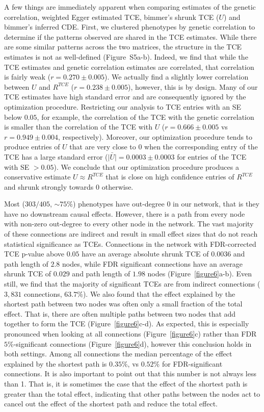 \documentclass{article}
\begin{document}
A few things are immediately apparent when comparing estimates of the
genetic correlation, weighted Egger estimated TCE, bimmer's
shrunk TCE ($U$) and bimmer's inferred CDE. First, we clustered phenotypes by genetic correlation
to determine if the patterns observed are shared in the TCE estimates.
While there are some similar patterns across the two matrices, the structure in the TCE estimates
is not as well-defined (Figure~S5a-b).
Indeed, we find that while the TCE estimates
and genetic correlation estimates are correlated, that correlation is fairly
weak ($r = 0.270\pm 0.005$). We actually find a slightly lower correlation between
 $U$ and $R^{TCE}$ ($r = 0.238 \pm 0.005$), however, this is by design.
Many of our TCE estimates have high standard error and are consequently
ignored by the optimization procedure. Restricting our analysis to TCE entries with an
SE below $0.05$, for example, the correlation of the TCE with the genetic correlation is smaller
than the correlation of the TCE with $U$ ($r = 0.666 \pm 0.005$ vs $r = 0.949 \pm 0.004$, respectively).
Moreover, our optimization
procedure tends to produce entries of $U$ that are very close to $0$ when the corresponding
entry of the TCE has a large standard error ($\bar{|U|} = 0.0003 \pm 0.0003$ for entries of
the TCE with SE $> 0.05$). We conclude that our optimization procedure produces a conservative
estimate $U \approx R^{TCE}$ that is close on high confidence entries of $R^{TCE}$ and
shrunk strongly towards 0 otherwise.


Most ($303/405$, $\sim 75\%$) phenotypes have out-degree $0$ in our network, that is they have no
downstream causal effects. However, there is a path from every node with non-zero
out-degree to every other node in the network. The vast majority of these connections
are indirect and result in small effect sizes that do not reach
statistical significance as TCEs. Connections in the network with FDR-corrected TCE p-value above
$0.05$ have an average absolute shrunk TCE of $0.0036$ and path length of $2.8$ nodes, while
FDR significant connections have an average shrunk TCE of $0.029$ and path length of $1.98$ nodes
(Figure~\ref{figure6}a-b). Even still, we find that the majority of significant TCEs are from indirect
connections ($3,831$ connections, $63.7\%$).
We also found that the effect explained by the shortest path between two nodes was often only a small
fraction of the total effect. That is, there are often multiple paths between two nodes that add together
to form the TCE (Figure~\ref{figure6}c-d). As expected, this is especially pronounced 
when looking at all connections (Figure~\ref{figure6}c) rather than FDR $5\%$-significant connections
(Figure~\ref{figure6}d), however this conclusion holds in both settings.
Among all connections the median percentage of the effect explained
by the shortest path is $0.35\%$, vs $0.52\%$ for FDR-significant connections. It is also important
to point out that this number is not always less than 1. That is, it is sometimes the case that the
effect of the shortest path is greater than the total effect, indicating that other paths between
the nodes act to cancel out the effect of the shortest path and reduce the total effect.
\end{document}
